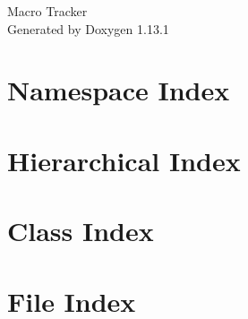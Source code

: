 \documentclass[twoside]{book}
\newcommand{\+}{\discretionary{\mbox{\scriptsize$\hookleftarrow$}}{}{}}
\newcommand{\clearemptydoublepage}{%
    \newpage{\pagestyle{empty}\cleardoublepage}%
  }
\begin{document}
  \raggedbottom
    \hypersetup{pageanchor=false,
                bookmarksnumbered=true,
                pdfencoding=unicode
               }
  \begin{titlepage}
  \vspace*{7cm}
  \begin{center}%
  {\Large Macro Tracker}\\
  \vspace*{1cm}
  {\large Generated by Doxygen 1.13.1}\\
  \end{center}
  \end{titlepage}
  \clearemptydoublepage
  \tableofcontents
  \clearemptydoublepage
  \hypersetup{pageanchor=true}

\chapter{Namespace Index}

\chapter{Hierarchical Index}

\chapter{Class Index}

\chapter{File Index}

\end{document}

